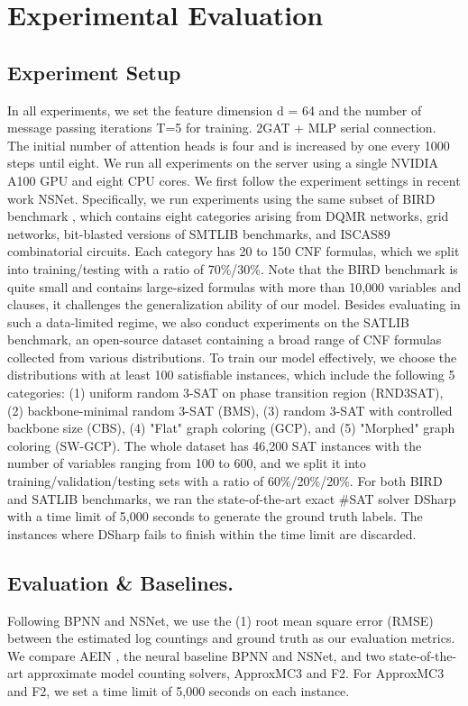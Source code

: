 \section{Experimental Evaluation}
\subsection{Experiment Setup}
In all experiments, we set the feature dimension d = 64 and the number of message passing iterations T=5 for training. 
2GAT + MLP serial connection. The initial number of attention heads is four and is increased by one every 1000 steps 
until eight. We run all experiments on the server using a single NVIDIA A100 GPU and eight CPU cores.
We first follow the experiment settings in recent work NSNet. Specifically, we run experiments using the same subset 
of BIRD benchmark\cite{A19} , which contains eight categories arising from DQMR networks, grid networks, bit-blasted 
versions of SMTLIB benchmarks, and ISCAS89 combinatorial circuits. Each category has 20 to 150 CNF formulas, which we 
split into training/testing with a ratio of 70\%/30\%. Note that the BIRD benchmark is quite small and contains 
large-sized formulas with more than 10,000 variables and clauses, it challenges the generalization ability of our model. 
Besides evaluating in such a data-limited regime, we also conduct experiments on the SATLIB benchmark, an open-source 
dataset containing a broad range of CNF formulas collected from various distributions. To train our model effectively, 
we choose the distributions with at least 100 satisfiable instances, which include the following 5 categories: (1) uniform 
random 3-SAT on phase transition region (RND3SAT), (2) backbone-minimal random 3-SAT (BMS), (3) random 3-SAT with controlled
backbone size (CBS), (4) "Flat" graph coloring (GCP), and (5) "Morphed" graph coloring (SW-GCP). The whole dataset has 
46,200 SAT instances with the number of variables ranging from 100 to 600, and we split it into training/validation/testing 
sets with a ratio of 60\%/20\%/20\%. For both BIRD and SATLIB benchmarks, we ran the state-of-the-art exact \#SAT solver 
DSharp\cite{B7} with a time limit of 5,000 seconds to generate the ground truth labels. The instances where DSharp fails to 
finish within the time limit are discarded.

\subsection{Evaluation \& Baselines.}
Following BPNN and NSNet, we use the (1) root mean square error (RMSE) between the estimated log countings and ground truth 
as our evaluation metrics. We compare AEIN , the neural baseline BPNN and NSNet, and two state-of-the-art approximate model
counting solvers, ApproxMC3\cite{A19} and F2\cite{B8}. For ApproxMC3 and F2, we set a time limit of 5,000 seconds on each instance.

